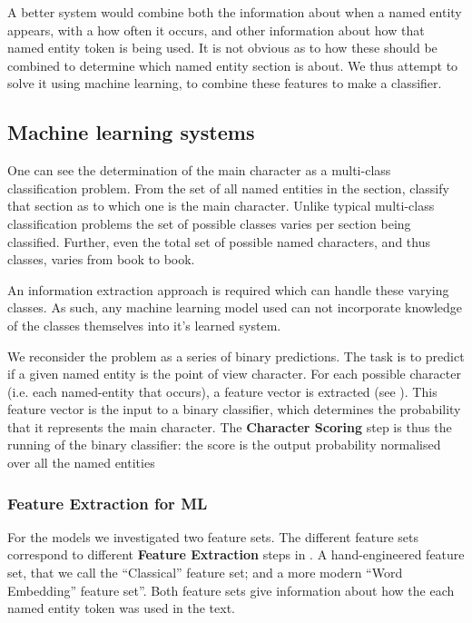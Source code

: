\documentclass[11pt,a4paper]{article}
\begin{document}
A better system would combine both the information about when a named entity appears,
with a how often it occurs, and other information about how that named entity token is being used.
It is not obvious as to how these should be combined to determine which named entity section is about.
We thus attempt to solve it using machine learning, to combine these features to make a classifier.

\subsection{Machine learning systems}
One can see the determination of the main character as a multi-class classification problem.
From the set of all named entities in the section, classify that section as to which one is the main character.
Unlike typical multi-class classification problems
the set of possible classes varies per section being classified.
Further, even the total set of possible named characters, and thus classes, varies from book to book.

An information extraction approach is required which can handle these varying classes.
As such, any machine learning model used can not incorporate knowledge of the classes themselves into it's learned system.

We reconsider the problem as a series of binary predictions.
The task is to predict if a given named entity is the point of view character.
For each possible character (i.e. each named-entity that occurs), a feature vector is extracted (see ).
This feature vector is the input to a binary classifier, which determines the probability that it represents the main character.
The \textbf{Character Scoring} step is thus the running of the binary classifier:
the score is the output probability normalised over all the named entities





\subsubsection{Feature Extraction for ML}\label{sec:feature-extraction-for-ml}
For the models we investigated two feature sets.
The different feature sets correspond to different \textbf{Feature Extraction} steps in .
A hand-engineered feature set, that we call the ``Classical'' feature set;
and a more modern ``Word Embedding'' feature set''.
Both feature sets give information about how the each named entity token was used in the text.
\end{document}
